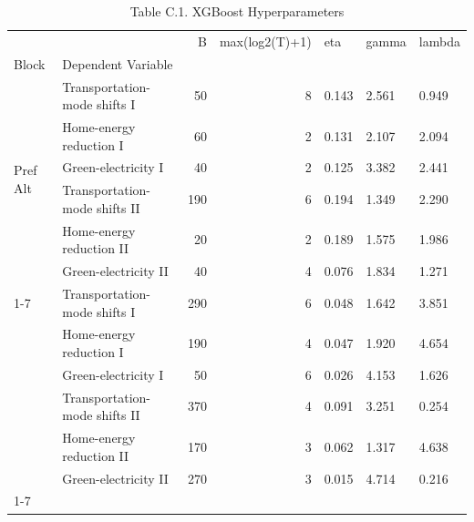\begin{table}
\caption{Table C.1. XGBoost Hyperparameters}
\begin{tabular}{llrrlll}
\toprule
 &  & B & max(log2(T)+1) & eta & gamma & lambda \\
Block & Dependent Variable &  &  &  &  &  \\
\midrule
\multirow[t]{6}{*}{Pref Alt} & Transportation-mode shifts I & 50 & 8 & 0.143 & 2.561 & 0.949 \\
 & Home-energy reduction I & 60 & 2 & 0.131 & 2.107 & 2.094 \\
 & Green-electricity I & 40 & 2 & 0.125 & 3.382 & 2.441 \\
 & Transportation-mode shifts II & 190 & 6 & 0.194 & 1.349 & 2.290 \\
 & Home-energy reduction II & 20 & 2 & 0.189 & 1.575 & 1.986 \\
 & Green-electricity II & 40 & 4 & 0.076 & 1.834 & 1.271 \\
\cline{1-7}
\multirow[t]{6}{*}{WTA} & Transportation-mode shifts I & 290 & 6 & 0.048 & 1.642 & 3.851 \\
 & Home-energy reduction I & 190 & 4 & 0.047 & 1.920 & 4.654 \\
 & Green-electricity I & 50 & 6 & 0.026 & 4.153 & 1.626 \\
 & Transportation-mode shifts II & 370 & 4 & 0.091 & 3.251 & 0.254 \\
 & Home-energy reduction II & 170 & 3 & 0.062 & 1.317 & 4.638 \\
 & Green-electricity II & 270 & 3 & 0.015 & 4.714 & 0.216 \\
\cline{1-7}
\bottomrule
\end{tabular}
\end{table}
